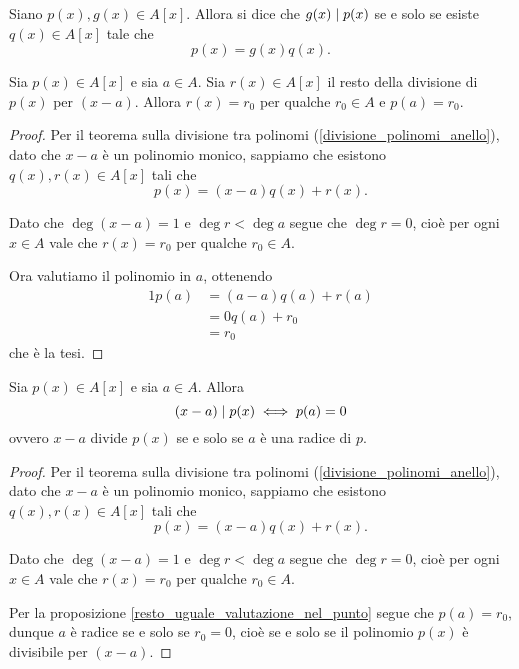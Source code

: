 \begin{definition}\label{divisione_polinomi_anello}
    Siano $p(x), g(x) \in A[x]$. Allora si dice che $g(x) \mid p(x)$ se e solo se esiste $q(x) \in A[x]$ tale che \[
        p(x) = g(x)q(x).    
    \]
\end{definition}

\begin{proposition}\label{resto_uguale_valutazione_nel_punto}
    Sia $p(x) \in A[x]$ e sia $a \in A$. Sia $r(x) \in A[x]$ il resto della divisione di $p(x)$ per $(x-a)$. Allora $r(x) = r_0$ per qualche $r_0 \in A$ e $p(a) = r_0$.
\end{proposition}
\begin{proof}
    Per il teorema sulla divisione tra polinomi (\ref{divisione_polinomi_anello}), dato che $x-a$ è un polinomio monico, sappiamo che esistono $q(x), r(x) \in A[x]$ tali che \[
        p(x) = (x-a)q(x) + r(x).
    \]

    Dato che $\deg (x - a) = 1$ e $\deg r < \deg a$ segue che $\deg r = 0$, cioè per ogni $x \in A$ vale che $r(x) = r_0$ per qualche $r_0 \in A$.

    Ora valutiamo il polinomio in $a$, ottenendo \begin{alignat*}
        {1}
        p(a) &= (a-a)q(a) + r(a)\\
        &= 0q(a) + r_0\\
        &= r_0
    \end{alignat*}
    che è la tesi.
\end{proof}

\begin{theorem}
     \label{th_Ruffini}
    Sia $p(x) \in A[x]$ e sia $a \in A$. Allora \[
        (x - a) \mid p(x) \iff p(a) = 0    
    \] ovvero $x - a$ divide $p(x)$ se e solo se $a$ è una radice di $p$.
\end{theorem}
\begin{proof}
    Per il teorema sulla divisione tra polinomi (\ref{divisione_polinomi_anello}), dato che $x-a$ è un polinomio monico, sappiamo che esistono $q(x), r(x) \in A[x]$ tali che \[
        p(x) = (x-a)q(x) + r(x).
    \]

    Dato che $\deg (x - a) = 1$ e $\deg r < \deg a$ segue che $\deg r = 0$, cioè per ogni $x \in A$ vale che $r(x) = r_0$ per qualche $r_0 \in A$.

    Per la proposizione \ref{resto_uguale_valutazione_nel_punto} segue che $p(a) = r_0$, dunque $a$ è radice se e solo se $r_0 = 0$, cioè se e solo se il polinomio $p(x)$ è divisibile per $(x - a)$.
\end{proof}

